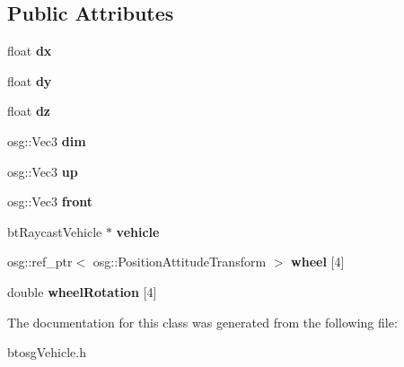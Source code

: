 \subsection*{Public Attributes}
\begin{DoxyCompactItemize}
\item 
\mbox{\label{classbtosgVehicle_aed23010bba3c34158abd4548328b3819}} 
float {\bfseries dx}
\item 
\mbox{\label{classbtosgVehicle_ae124e1cd8c424080d7be7c47edb07eb1}} 
float {\bfseries dy}
\item 
\mbox{\label{classbtosgVehicle_a39857392dc4882886964c1beefa46268}} 
float {\bfseries dz}
\item 
\mbox{\label{classbtosgVehicle_afed9fb742c4a8ed58e8d6202dfc20344}} 
osg\+::\+Vec3 {\bfseries dim}
\item 
\mbox{\label{classbtosgVehicle_a8f68a9e001e79f61602427228c97fe26}} 
osg\+::\+Vec3 {\bfseries up}
\item 
\mbox{\label{classbtosgVehicle_a5b21a5ad3a8583f773bce6b894ac010d}} 
osg\+::\+Vec3 {\bfseries front}
\item 
\mbox{\label{classbtosgVehicle_ac45b117f8b523f7040de99639deb7522}} 
bt\+Raycast\+Vehicle $\ast$ {\bfseries vehicle}
\item 
\mbox{\label{classbtosgVehicle_a37edb4c28551037829ffd79c7bc315ba}} 
osg\+::ref\+\_\+ptr$<$ osg\+::\+Position\+Attitude\+Transform $>$ {\bfseries wheel} \mbox{[}4\mbox{]}
\item 
\mbox{\label{classbtosgVehicle_a0a9cd6f2c9b0defc44cd5e2e8d597418}} 
double {\bfseries wheel\+Rotation} \mbox{[}4\mbox{]}
\end{DoxyCompactItemize}


The documentation for this class was generated from the following file\+:\begin{DoxyCompactItemize}
\item 
btosg\+Vehicle.\+h\end{DoxyCompactItemize}
